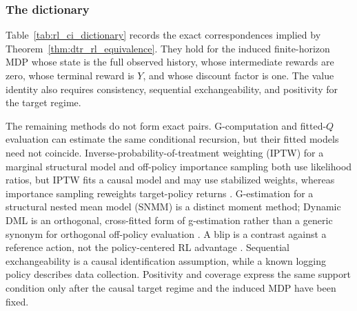 \subsubsection*{The dictionary}

Table~\ref{tab:rl_ci_dictionary} records the exact correspondences implied by Theorem~\ref{thm:dtr_rl_equivalence}. They hold for the induced finite-horizon MDP whose state is the full observed history, whose intermediate rewards are zero, whose terminal reward is $Y$, and whose discount factor is one. The value identity also requires consistency, sequential exchangeability, and positivity for the target regime.

The remaining methods do not form exact pairs. G-computation and fitted-$Q$ evaluation can estimate the same conditional recursion, but their fitted models need not coincide. Inverse-probability-of-treatment weighting (IPTW) for a marginal structural model and off-policy importance sampling both use likelihood ratios, but IPTW fits a causal model and may use stabilized weights, whereas importance sampling reweights target-policy returns \citep{robins2000msm, precup2000}. G-estimation for a structural nested mean model (SNMM) is a distinct moment method; Dynamic DML is an orthogonal, cross-fitted form of g-estimation rather than a generic synonym for orthogonal off-policy evaluation \citep{robins2004snmm, lewisSyrgkanis2021dynamicDML}. A blip is a contrast against a reference action, not the policy-centered RL advantage \citep{schulte2014qlearning}. Sequential exchangeability is a causal identification assumption, while a known logging policy describes data collection. Positivity and coverage express the same support condition only after the causal target regime and the induced MDP have been fixed.

